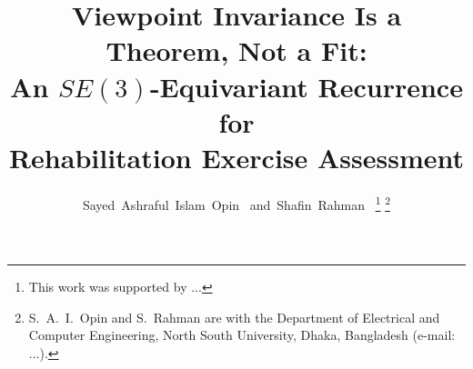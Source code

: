 \documentclass[10pt,journal]{IEEEtran}
\begin{document}
\title{Viewpoint Invariance Is a Theorem, Not a Fit:\\%
An $SE(3)$-Equivariant Recurrence for\\%
Rehabilitation Exercise Assessment}

\author{Sayed~Ashraful~Islam~Opin~
        and~Shafin~Rahman~%
\thanks{This work was supported by ...}
\thanks{S.~A.~I.~Opin and S.~Rahman are with the Department of Electrical and Computer Engineering, North South University, Dhaka, Bangladesh (e-mail: ...).}}

\maketitle

\end{document}
